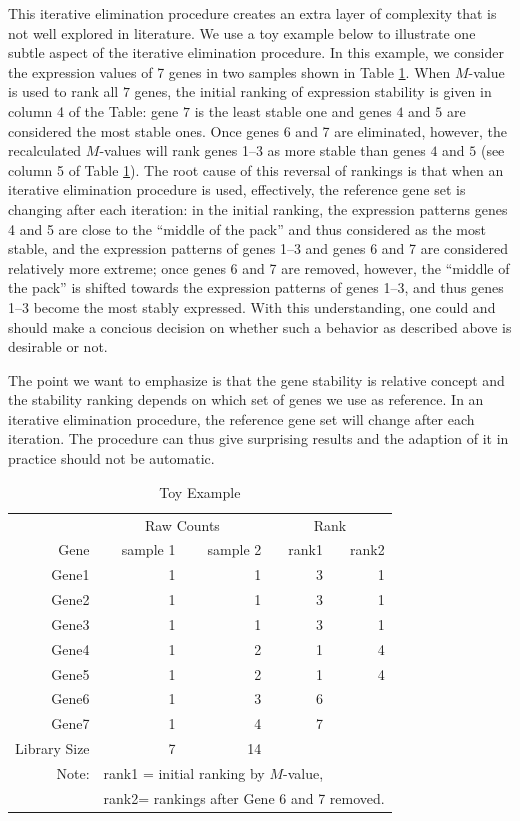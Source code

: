 \documentclass[11pt, a4paper]{article}
\begin{document}
This iterative elimination procedure creates an extra layer of complexity that
is not well explored in literature. We use a toy example below to illustrate
one subtle aspect of the iterative elimination procedure.  In this example, we
consider the expression values of 7 genes in two samples shown in Table
\ref{table:toyexample}. When $M$-value is used to rank all $7$ genes, the
initial ranking of expression stability is given in column 4 of the Table:
gene $7$ is the least stable one and genes $4$ and $5$ are considered the most
stable ones.  Once genes 6 and 7 are eliminated, however, the recalculated
$M$-values will rank genes 1--3 as more stable than genes $4$ and
$5$ (see column 5 of Table \ref{table:toyexample}). The root cause of this
reversal of rankings is that when an iterative elimination procedure is used,
effectively, the reference gene set is changing after each iteration: in the
initial ranking, the expression patterns genes 4 and 5 are close to the
``middle of the pack'' and thus considered as the most stable, and the
expression patterns of genes 1--3 and genes 6 and 7 are considered relatively
more extreme; once genes 6 and 7 are removed, however, the ``middle of the
pack'' is shifted towards the expression patterns of genes 1--3, and thus
genes 1--3 become the most stably expressed.  With this understanding, one
could and should make a concious decision on whether such a behavior as
described above is desirable or not.  

The point we want to emphasize is that the gene stability is relative concept
and the stability ranking depends on which set of genes we use as reference.
In an iterative elimination procedure, the reference gene set will change
after each iteration. The procedure can thus give surprising results and the
adaption of it in practice should not be automatic.

 
\begin{table}[ht] \centering \caption{Toy Example} \begin{tabular}{rrrrr}
    \hline & \multicolumn{2}{c}{Raw Counts} & \multicolumn{2}{c}{Rank}\\
     Gene & sample 1 & sample 2 & rank1 & rank2 \\ \hline 
    Gene1 & 1 & 1 & 3 & 1 \\ 
    Gene2 & 1 & 1 & 3 & 1 \\ 
    Gene3 & 1 & 1 & 3 & 1 \\
     Gene4 & 1 & 2 & 1 & 4 \\ 
     Gene5 & 1 & 2 & 1 & 4 \\ 
     Gene6 & 1 & 3 & 6 &  \\ 
    Gene7 & 1 & 4 & 7 &  \\ \hline 
    Library Size & 7 & 14 & & 	\\ \hline 
    Note: &\multicolumn{4}{l}{ rank1 = initial ranking by $M$-value, } \\
    & \multicolumn{4}{l}{ rank2= rankings after Gene 6 and 7 removed.}
\end{tabular} \label{table:toyexample} \end{table}
\end{document}
